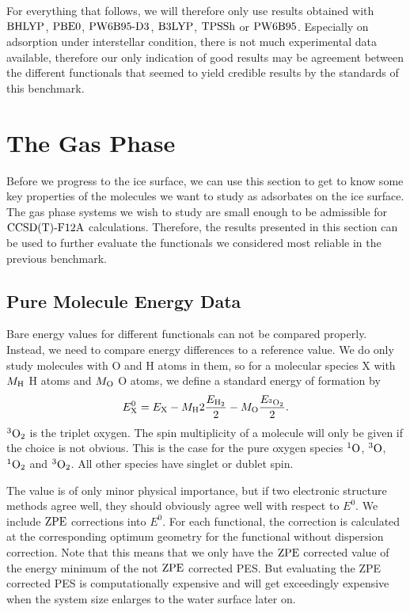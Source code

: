 \documentclass[8.5pt,twoside,twocolumn]{article}
\newcommand\zpe{\enmat{\te{ZPE}}}
\newcommand\singo{\enmat{{^1\te{O}}}}
\newcommand\tripo{\enmat{{^3\te{O}}}}
\newcommand\singot{\enmat{{^1\ot}}}
\newcommand\tripot{\enmat{{^3\ot}}}
\theoremstyle{standard}
\begin{document}
For everything that follows, we will therefore only use results obtained
with $\text{BHLYP}$, $\text{PBE0}$, $\text{PW6B95}\text{-D3}$, $\text{B3LYP}$, $\text{TPSSh}$ or $\text{PW6B95}$. Especially on
adsorption under interstellar condition, there is not much experimental
data available, therefore our only indication of good results may be
agreement between the different functionals that seemed to yield credible results
by the standards of this benchmark.
  
\section{The Gas Phase}
\label{Sec:Gas}

Before we progress to the ice surface, we can use this section
to get to know some key properties of the molecules we want to
study as adsorbates on the ice surface. The gas phase systems
we wish to study are small enough to be admissible for $\text{CCSD(T)-F12A}$
calculations. Therefore, the results presented in this section can
be used to further evaluate the functionals we considered most
reliable in the previous benchmark.

\subsection{Pure Molecule Energy Data}
\label{Sec:Gas:Energy}
Bare energy values for different functionals can not be compared
properly. Instead, we need to compare energy differences to
a reference value. We do only study molecules with O and H atoms
in them, so for a molecular species X with $M_{\text{H}}$ H atoms and 
$M_{\text O}$ O atoms, we define a standard energy of formation
by
\begin{equation}
E^0_\X=E_\X - M_{\te H} 2 \frac {E_{\htw}} 2 - M_{\te O} \frac {E_{\tripot}} 2.
\label{Gas:FormationEnergy} 
\end{equation}
$\tripot$ is the triplet oxygen. The spin multiplicity of a molecule will
only be given if the choice is not obvious. This is the case for the
pure oxygen species $\singo$, $\tripo$, $\singot$ and $\tripot$. All other
species have singlet or dublet spin.

The value is of only minor physical importance, but if two electronic
structure methods agree well, they should obviously agree well with respect to
$E^0$.
We include $\zpe$ corrections into $E^0$. For each functional, 
the correction is calculated at the corresponding optimum geometry
for the functional without dispersion correction. Note that this means
that we only have the $\zpe$ corrected value of the energy
minimum of the not $\zpe$ corrected PES. But evaluating the ZPE
corrected PES is computationally expensive and will get exceedingly expensive
when the system size enlarges to the water surface later on.
\end{document}
